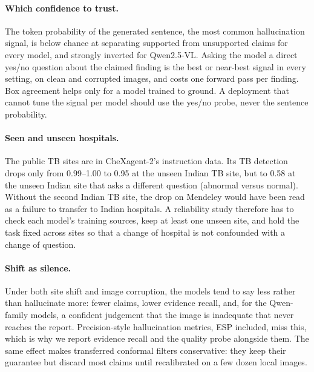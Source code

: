 \documentclass[pdflatex,sn-mathphys-num]{sn-jnl}
\theoremstyle{thmstyleone}
\begin{document}
\paragraph{Which confidence to trust.} The token probability of the generated sentence, the most common hallucination signal, is below chance at separating supported from unsupported claims for every model, and strongly inverted for Qwen2.5-VL. Asking the model a direct yes/no question about the claimed finding is the best or near-best signal in every setting, on clean and corrupted images, and costs one forward pass per finding. Box agreement helps only for a model trained to ground. A deployment that cannot tune the signal per model should use the yes/no probe, never the sentence probability.

\paragraph{Seen and unseen hospitals.} The public TB sites are in CheXagent-2's instruction data. Its TB detection drops only from 0.99--1.00 to 0.95 at the unseen Indian TB site, but to 0.58 at the unseen Indian site that asks a different question (abnormal versus normal). Without the second Indian TB site, the drop on Mendeley would have been read as a failure to transfer to Indian hospitals. A reliability study therefore has to check each model's training sources, keep at least one unseen site, and hold the task fixed across sites so that a change of hospital is not confounded with a change of question.

\paragraph{Shift as silence.} Under both site shift and image corruption, the models tend to say less rather than hallucinate more: fewer claims, lower evidence recall, and, for the Qwen-family models, a confident judgement that the image is inadequate that never reaches the report. Precision-style hallucination metrics, ESP included, miss this, which is why we report evidence recall and the quality probe alongside them. The same effect makes transferred conformal filters conservative: they keep their guarantee but discard most claims until recalibrated on a few dozen local images.
\end{document}
